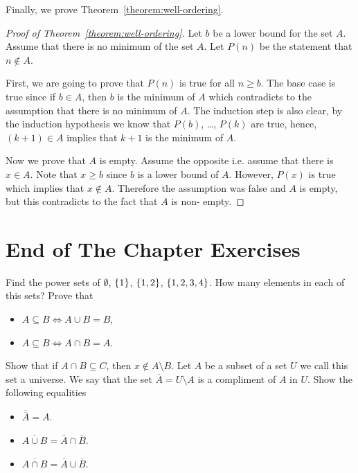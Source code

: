 Finally, we prove Theorem~\ref{theorem:well-ordering}.
\begin{proof}[Proof of Theorem~\ref{theorem:well-ordering}]
  Let $b$ be a lower bound for the set $A$. Assume that there is no minimum of
  the set $A$. Let $P(n)$ be the statement that
  $n \notin A$.

  First, we are going to prove that $P(n)$ is true for all
  $n \ge b$. The base case is true since if $b \in A$, then $b$ is the minimum
  of $A$ which contradicts to the assumption that there is no minimum of $A$.
  The induction step is also clear, by the induction hypothesis we know that
  $P(b)$, \dots, $P(k)$ are true, hence, $(k + 1) \in A$ implies that $k + 1$
  is the minimum of $A$.

  Now we prove that $A$ is empty. Assume the opposite i.e. assume that there is
  $x \in A$. Note that $x \ge b$ since $b$ is a lower bound of $A$. However,
  $P(x)$ is true which implies that $x \notin A$. Therefore the assumption was
  false and $A$ is empty, but this contradicts to the fact that $A$ is non-
  empty.
\end{proof}

\section*{End of The Chapter Exercises}
\begin{exercises}
  \exerciseitem Find the power sets of $\emptyset$, $\set{1}$, $\set{1, 2}$,
    $\set{1, 2, 3, 4}$. How many elements in each of this sets?
  \exerciseitem Prove that
    \begin{itemize}
      \item $A \subseteq B \iff A \cup B = B$,
      \item $A \subseteq B \iff A \cap B = A$.
    \end{itemize}
  \exerciseitem Show that if $A \cap B \subseteq C$, then
    $x \notin A \setminus B$.
  \exerciseitem Let $A$ be a subset of a set $U$ we call this set a universe.
    We say that the set $\overline{A} = U \setminus A$ is a compliment of $A$
    in $U$. Show the following equalities
    \begin{itemize}
      \item $\overline{\overline{A}} = A$.
      \item $\overline{A \cup B} = \overline{A} \cap \overline{B}$.
      \item $\overline{A \cap B} = \overline{A} \cup \overline{B}$.
    \end{itemize}
\end{exercises}
